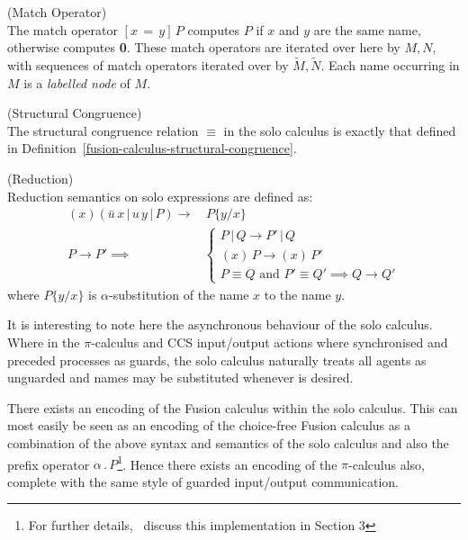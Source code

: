     \begin{definition}{(Match Operator)\\}
        The match operator $[x \, = \, y] \, P$ computes $P$ if $x$ and $y$ are the same name, otherwise computes \textbf{0}.
        These match operators are iterated over here by $M, N$, with sequences of match operators iterated over by $\tilde{M}, \tilde{N}$.
        Each name occurring in $M$ is a \textit{labelled node} of $M$.
    \end{definition}


    \begin{definition}{(Structural Congruence)\\}
        The structural congruence relation $\equiv$ in the solo calculus is exactly that defined in Definition~\ref{fusion-calculus-structural-congruence}.
    \end{definition}


    \begin{definition}{(Reduction)\\}
        Reduction semantics on solo expressions are defined as:
        \begin{align}
            (x)(\bar{u} \, x \, | \, u \, y \, | \, P) \rightarrow & \, P\{y / x\} \\
            P \rightarrow P' \implies &
            \begin{cases}
                P \, | \, Q \rightarrow P' \, | \, Q \\
                (x) \, P \rightarrow (x) \, P' \\
                P \equiv Q \text{ and } P' \equiv Q' \implies Q \rightarrow Q'
            \end{cases}
        \end{align}
        where $P\{y / x\}$ is $\alpha$-substitution of the name $x$ to the name $y$.
    \end{definition}
    It is interesting to note here the asynchronous behaviour of the solo calculus.
    Where in the $\pi$-calculus and CCS input/output actions where synchronised and preceded processes as guards, the solo calculus naturally treats all agents as unguarded and names may be substituted whenever is desired.


    \begin{remark*}
        There exists an encoding of the Fusion calculus within the solo calculus.
        This can most easily be seen as an encoding of the choice-free Fusion calculus as a combination of the above syntax and semantics of the solo calculus and also the prefix operator $\alpha \, . \, P$\footnote{For further details,~\cite{solo-calculus} discuss this implementation in Section 3}.
        Hence there exists an encoding of the $\pi$-calculus also, complete with the same style of guarded input/output communication.
    \end{remark*}





